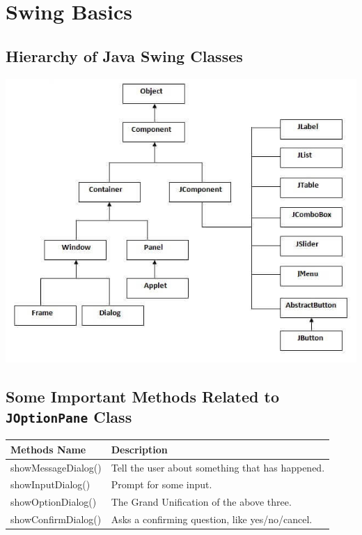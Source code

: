 \chapter{Swing Basics}

\section{Hierarchy of Java Swing Classes}
\begin{center}
\includegraphics[scale=.7]{Figures/swinghierarchy.jpg}
\end{center}

\newpage
\section{Some Important Methods Related to \texttt{JOptionPane} Class}
\begin{table}[!h]
\begin{center}
\begin{tabular}{l|l}
	\hline
	\textbf{Methods Name} & \textbf{Description}\\
	\hline
	showMessageDialog() & Tell the user about something that has happened. \\
	\hline
	showInputDialog() & Prompt for some input.\\
	\hline
	showOptionDialog() & The Grand Unification of the above three.\\
	\hline
	showConfirmDialog() & Asks a confirming question, like yes/no/cancel.\\
	\hline
\end{tabular}
\end{center}
\end{table}

